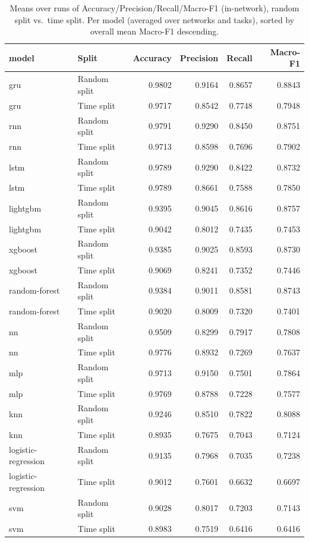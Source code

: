 \begin{table}
\caption{Means over runs of Accuracy/Precision/Recall/Macro-F1 (in-network), random split vs.\ time split. Per model (averaged over networks and tasks), sorted by overall mean Macro-F1 descending.}
\label{tab:q2_appendix_per_model}
\begin{tabular}{llrrrr}
\toprule
model & Split & Accuracy & Precision & Recall & Macro-F1 \\
\midrule
gru & Random split & 0.9802 & 0.9164 & 0.8657 & 0.8843 \\
gru & Time split & 0.9717 & 0.8542 & 0.7748 & 0.7948 \\
rnn & Random split & 0.9791 & 0.9290 & 0.8450 & 0.8751 \\
rnn & Time split & 0.9713 & 0.8598 & 0.7696 & 0.7902 \\
lstm & Random split & 0.9789 & 0.9290 & 0.8422 & 0.8732 \\
lstm & Time split & 0.9789 & 0.8661 & 0.7588 & 0.7850 \\
lightgbm & Random split & 0.9395 & 0.9045 & 0.8616 & 0.8757 \\
lightgbm & Time split & 0.9042 & 0.8012 & 0.7435 & 0.7453 \\
xgboost & Random split & 0.9385 & 0.9025 & 0.8593 & 0.8730 \\
xgboost & Time split & 0.9069 & 0.8241 & 0.7352 & 0.7446 \\
random-forest & Random split & 0.9384 & 0.9011 & 0.8581 & 0.8743 \\
random-forest & Time split & 0.9020 & 0.8009 & 0.7320 & 0.7401 \\
nn & Random split & 0.9509 & 0.8299 & 0.7917 & 0.7808 \\
nn & Time split & 0.9776 & 0.8932 & 0.7269 & 0.7637 \\
mlp & Random split & 0.9713 & 0.9150 & 0.7501 & 0.7864 \\
mlp & Time split & 0.9769 & 0.8788 & 0.7228 & 0.7577 \\
knn & Random split & 0.9246 & 0.8510 & 0.7822 & 0.8088 \\
knn & Time split & 0.8935 & 0.7675 & 0.7043 & 0.7124 \\
logistic-regression & Random split & 0.9135 & 0.7968 & 0.7035 & 0.7238 \\
logistic-regression & Time split & 0.9012 & 0.7601 & 0.6632 & 0.6697 \\
svm & Random split & 0.9028 & 0.8017 & 0.7203 & 0.7143 \\
svm & Time split & 0.8983 & 0.7519 & 0.6416 & 0.6416 \\
\bottomrule
\end{tabular}
\end{table}
